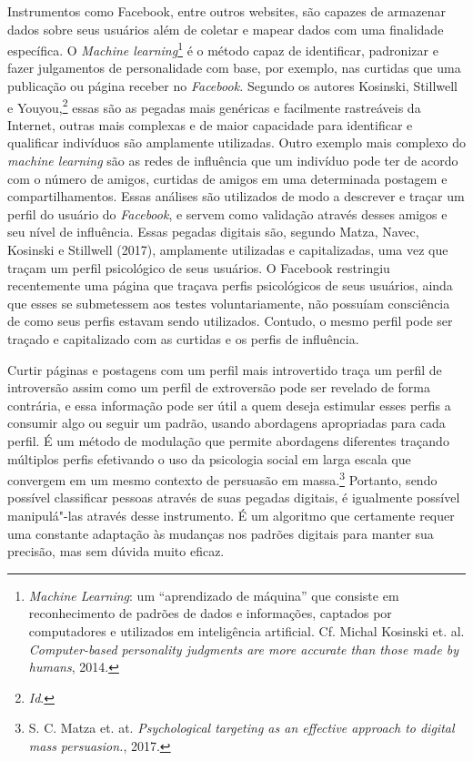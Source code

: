 Instrumentos como Facebook, entre outros websites, são capazes de
armazenar dados sobre seus usuários além de coletar e mapear dados com
uma finalidade específica. O \emph{Machine learning}\footnote{\emph{Machine
  Learning}: um ``aprendizado de máquina'' que consiste em reconhecimento
  de padrões de dados e informações, captados por computadores e
  utilizados em inteligência artificial. Cf. Michal Kosinski et. al. \emph{Computer-based
personality judgments are more accurate than those made by
humans}, 2014.} é o método capaz de identificar, padronizar e fazer julgamentos
de personalidade com base, por exemplo, nas curtidas que uma publicação
ou página receber no \emph{Facebook.} Segundo os autores
Kosinski, Stillwell e Youyou,\footnote{\textit{Id}.} essas são as pegadas mais genéricas
e facilmente rastreáveis da Internet, outras mais complexas e de maior
capacidade para identificar e qualificar indivíduos são amplamente
utilizadas. Outro exemplo mais complexo do \emph{machine learning} são
as redes de influência que um indivíduo pode ter de acordo com o número
de amigos, curtidas de amigos em uma determinada postagem e
compartilhamentos. Essas análises são utilizados de modo a descrever
e traçar um perfil do usuário do \emph{Facebook}, e servem como
validação através desses amigos e seu nível de influência. Essas pegadas
digitais são, segundo Matza, Navec, Kosinski e Stillwell (2017),
amplamente utilizadas e capitalizadas, uma vez que traçam um perfil
psicológico de seus usuários. O Facebook restringiu recentemente uma
página que traçava perfis psicológicos de seus usuários, ainda que esses
se submetessem aos testes voluntariamente, não possuíam consciência de
como seus perfis estavam sendo utilizados. Contudo, o mesmo perfil pode
ser traçado e capitalizado com as curtidas e os perfis de influência.

Curtir páginas e postagens com um perfil mais introvertido traça um
perfil de introversão assim como um perfil de extroversão pode ser
revelado de forma contrária, e essa informação pode ser útil a quem
deseja estimular esses perfis a consumir algo ou seguir um padrão,
usando abordagens apropriadas para cada perfil. É um método de modulação
que permite abordagens diferentes traçando múltiplos perfis efetivando o
uso da psicologia social em larga escala que convergem em um mesmo
contexto de persuasão em massa.\footnote{S. C. Matza et. at. \emph{Psychological targeting as an effective approach to digital mass persuasion.}, 2017.}
Portanto, sendo possível classificar pessoas através de suas pegadas
digitais, é igualmente possível manipulá"-las através desse instrumento.
É um algoritmo que certamente requer uma constante adaptação às mudanças
nos padrões digitais para manter sua precisão, mas sem dúvida muito
eficaz.

